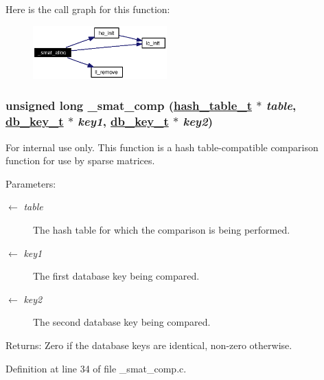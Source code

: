 Here is the call graph for this function:\begin{figure}[H]
\begin{center}
\leavevmode
\includegraphics[width=146pt]{group__dbprim__smat_ga25_cgraph}
\end{center}
\end{figure}
\hypertarget{group__dbprim__smat_ga10}{
\subsubsection[\_\-smat\_\-comp]{\setlength{\rightskip}{0pt plus 5cm}unsigned long \_\-smat\_\-comp (\hyperlink{struct__hash__table__s}{hash\_\-table\_\-t} $\ast$ {\em table}, \hyperlink{struct__db__key__s}{db\_\-key\_\-t} $\ast$ {\em key1}, \hyperlink{struct__db__key__s}{db\_\-key\_\-t} $\ast$ {\em key2})}}
\label{group__dbprim__smat_ga10}


\begin{Desc}
\item[For internal use only.]
This function is a hash table-compatible comparison function for use by sparse matrices.

\begin{Desc}
\item[Parameters:]
\begin{description}
\item[\mbox{$\leftarrow$} {\em table}]The hash table for which the comparison is being performed. \item[\mbox{$\leftarrow$} {\em key1}]The first database key being compared. \item[\mbox{$\leftarrow$} {\em key2}]The second database key being compared.\end{description}
\end{Desc}
\begin{Desc}
\item[Returns:]Zero if the database keys are identical, non-zero otherwise.\end{Desc}
\end{Desc}


Definition at line 34 of file \_\-smat\_\-comp.c.

